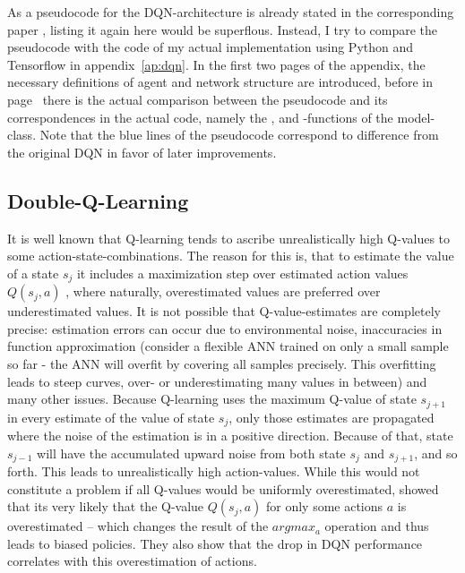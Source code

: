 As a pseudocode for the DQN-architecture is already stated in the corresponding paper \cite{mnih_human-level_2015}, listing it again here would be superflous. Instead, I try to compare the pseudocode with the code of my actual implementation using Python and Tensorflow in appendix~\ref{ap:dqn}. In the first two pages of the appendix, the necessary definitions of agent and network structure are introduced, before in page~\pageref{ap:dqn_comparison} there is the actual comparison between the pseudocode and its correspondences in the actual code, namely the ,  and -functions of the model-class. Note that the blue lines of the pseudocode correspond to difference from the original DQN in favor of later improvements.

\subsection{Double-Q-Learning}
It is well known that Q-learning tends to ascribe unrealistically high Q-values to some action-state-combinations. The reason for this is, that to estimate the value of a state $s_j$ it includes a maximization step over estimated action values $Q(s_j,a)$ , where naturally, overestimated values are preferred over underestimated values. 
It is not possible that Q-value-estimates are completely precise: estimation errors can occur due to environmental noise, inaccuracies in function approximation (consider a flexible ANN trained on only a small sample so far - the ANN will overfit by covering all samples precisely. This overfitting leads to steep curves, over- or underestimating many values in between) and many other issues. Because Q-learning uses the maximum Q-value of state $s_{j+1}$ in every estimate of the value of state $s_j$, only those estimates are propagated where the noise of the estimation is in a positive direction. Because of that, state $s_{j-1}$ will have the accumulated upward noise from both state $s_j$ and $s_{j+1}$, and so forth. This leads to unrealistically high action-values. While this would not constitute a problem if all Q-values would be uniformly overestimated, \cite{van_hasselt_deep_2015} showed that its very likely that the Q-value $Q(s_j,a)$ for only some actions $a$ is overestimated -- which changes the result of the $argmax_a$ operation and thus leads to biased policies. They also show that the drop in DQN performance correlates with this overestimation of actions.\\

